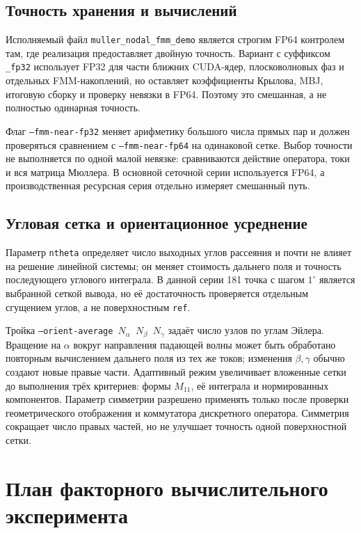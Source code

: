 \documentclass[12pt,a4paper]{article}
\begin{document}
\subsection{Точность хранения и вычислений}

Исполняемый файл \texttt{muller\_nodal\_fmm\_demo} является строгим FP64
контролем там, где реализация предоставляет двойную точность. Вариант с
суффиксом \texttt{\_fp32} использует FP32 для части ближних CUDA-ядер,
плосковолновых фаз и отдельных FMM-накоплений, но оставляет коэффициенты
Крылова, MBJ, итоговую сборку и проверку невязки в FP64. Поэтому это смешанная,
а не полностью одинарная точность.

Флаг \texttt{--fmm-near-fp32} меняет арифметику большого числа прямых пар и
должен проверяться сравнением с \texttt{--fmm-near-fp64} на одинаковой сетке.
Выбор точности не выполняется по одной малой невязке: сравниваются действие
оператора, токи и вся матрица Мюллера. В основной сеточной серии используется
FP64, а производственная ресурсная серия отдельно измеряет смешанный путь.

\subsection{Угловая сетка и ориентационное усреднение}

Параметр \texttt{ntheta} определяет число выходных углов рассеяния и почти не
влияет на решение линейной системы; он меняет стоимость дальнего поля и
точность последующего углового интеграла. В данной серии 181 точка с шагом
$1^\circ$ является выбранной сеткой вывода, но её достаточность проверяется
отдельным сгущением углов, а не поверхностным \texttt{ref}.

Тройка \texttt{--orient-average $N_\alpha$ $N_\beta$ $N_\gamma$} задаёт число
узлов по углам Эйлера. Вращение на $\alpha$ вокруг направления падающей волны
может быть обработано повторным вычислением дальнего поля из тех же токов;
изменения $\beta,\gamma$ обычно создают новые правые части. Адаптивный режим
увеличивает вложенные сетки до выполнения трёх критериев: формы $M_{11}$, её
интеграла и нормированных компонентов. Параметр симметрии разрешено применять
только после проверки геометрического отображения и коммутатора дискретного
оператора. Симметрия сокращает число правых частей, но не улучшает точность
одной поверхностной сетки.

\section{План факторного вычислительного эксперимента}
\end{document}
